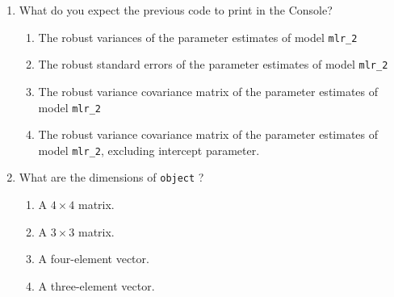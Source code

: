 \documentclass{article}
\begin{document}
\begin{enumerate}[resume]
  \item What do you expect the previous code to print in the Console?
  \begin{enumerate}[label=\Alph*)]
    \item The robust variances of the parameter estimates of model \texttt{mlr\_2}
    \item The robust standard errors of the parameter estimates of model \texttt{mlr\_2}
    \item The robust variance covariance matrix of the parameter estimates of model \texttt{mlr\_2}
    \item The robust variance covariance matrix of the parameter estimates of model \texttt{mlr\_2}, excluding intercept parameter.
  \end{enumerate}
  \item What are the dimensions of \texttt{object} ?
  \begin{enumerate}[label=\Alph*)]
    \item A $4 \times 4$ matrix.
    \item A $3 \times 3$ matrix.
    \item A four-element vector.
    \item A three-element vector.
  \end{enumerate}
\end{enumerate}
\end{document}
